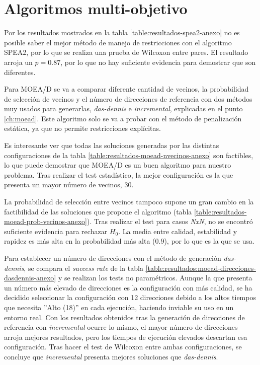 \renewcommand{\arraystretch}{1}
\newpage
\section{Algoritmos multi-objetivo}
\label{ch:algoritmos-multiobjetivo}

Por los resultados mostrados en la tabla \ref{table:resultados-spea2-anexo} no es posible saber el mejor método de manejo de restricciones con el algoritmo SPEA2, por lo que se realiza una prueba de Wilcoxon entre pares. El resultado arroja un \textit{$p = 0.87$}, por lo que no hay suficiente evidencia para demostrar que son diferentes.

Para MOEA/D se va a comparar diferente cantidad de vecinos, la probabilidad de selección de vecinos y el número de direcciones de referencia con dos métodos muy usados para generarlas, \textit{das-dennis} e \textit{incremental}, explicadas en el punto \ref{ch:moead}. Este algoritmo solo se va a probar con el método de penalización estática, ya que no permite restricciones explícitas.

Es interesante ver que todas las soluciones generadas por las distintas configuraciones de la tabla \ref{table:resultados-moead-nvecinos-anexo} son factibles, lo que puede demostrar que MOEA/D es un buen algoritmo para nuestro problema. Tras realizar el test estadístico, la mejor configuración es la que presenta un mayor número de vecinos, 30.

La probabilidad de selección entre vecinos tampoco supone un gran cambio en la factibilidad de las soluciones que propone el algoritmo (tabla \ref{table:resultados-moead-prob-vecinos-anexo}). Tras realizar el test para casos \textit{NxN}, no se encontró suficiente evidencia para rechazar \(H_0\). La media entre calidad, estabilidad y rapidez es más alta en la probabilidad más alta (0.9), por lo que es la que se usa.

Para establecer un número de direcciones con el método de generación \textit{das-dennis}, se compara el \textit{success rate} de la tabla \ref{table:resultados:moead-direcciones-dasdennis-anexo} y se realizan los tests no paramétricos. Aunque la que presenta un número más elevado de direcciones es la configuración con más calidad, se ha decidido seleccionar la configuración con 12 direcciones debido a los altos tiempos que necesita ''Alto (18)'' en cada ejecución, haciendo inviable su uso en un entorno real. Con los resultados obtenidos tras la generación de direcciones de referencia con \textit{incremental} ocurre lo mismo, el mayor número de direcciones arroja mejores resultados, pero los tiempos de ejecución elevados descartan esa configuración. Tras hacer el test de Wilcoxon entre ambas configuraciones, se concluye que \textit{incremental} presenta mejores soluciones que \textit{das-dennis}.

